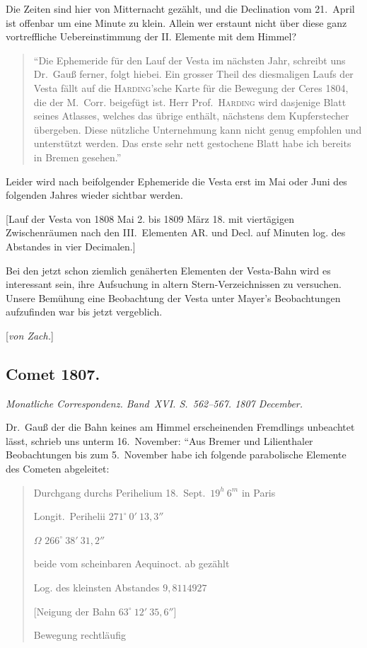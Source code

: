 \documentclass[12pt,a4paper]{book}
\begin{document}
Die Zeiten sind hier von Mitternacht gez\"ahlt, und die Declination vom 21.~April ist offenbar um eine Minute zu klein. Allein wer erstaunt nicht \"uber diese ganz vortreffliche Uebereinstimmung der II. Elemente mit dem Himmel?

\begin{quote}
``Die Ephemeride f\"ur den Lauf der Vesta im n\"achsten Jahr, schreibt uns Dr.~Gau{\ss} ferner, folgt hiebei. Ein grosser Theil des diesmaligen Laufs der Vesta f\"allt auf die \textsc{Harding}'sche Karte f\"ur die Bewegung der Ceres 1804, die der M.~Corr. beigef\"ugt ist. Herr Prof.~\textsc{Harding} wird dasjenige Blatt seines Atlasses, welches das \"ubrige enth\"alt, n\"achstens dem Kupferstecher \"ubergeben. Diese n\"utzliche Unternehmung kann nicht genug empfohlen und unterst\"utzt werden. Das erste sehr nett gestochene Blatt habe ich bereits in Bremen gesehen.''
\end{quote}

Leider wird nach beifolgender Ephemeride die Vesta erst im Mai oder Juni des folgenden Jahres wieder sichtbar werden.

[Lauf der Vesta von 1808 Mai 2. bis 1809 M\"arz 18. mit viert\"agigen Zwischenr\"aumen nach den III.~Elementen AR. und Decl. auf Minuten log. des Abstandes in vier Decimalen.]

Bei den jetzt schon ziemlich gen\"aherten Elementen der Vesta-Bahn wird es interessant sein, ihre Aufsuchung in altern Stern-Verzeichnissen zu versuchen. Unsere Bem\"uhung eine Beobachtung der Vesta unter Mayer's Beobachtungen aufzufinden war bis jetzt vergeblich.

[\textit{von Zach.}]


\newpage
\subsection*{Comet 1807.}

\textit{Monatliche Correspondenz. Band~XVI. S.~562--567. 1807 December.}

Dr.~Gau{\ss} der die Bahn keines am Himmel erscheinenden Fremdlings unbeachtet l\"asst, schrieb uns unterm 16.~November: ``Aus Bremer und Lilienthaler Beobachtungen bis zum 5.~November habe ich folgende parabolische Elemente des Cometen abgeleitet:

\begin{quote}
Durchgang durchs Perihelium 18.~Sept.\ $19^{h}\ 6^{m}$ in Paris

Longit.~Perihelii \dotfill $271^{\circ}\ 0'\ 13{,}3''$

$\Omega$ \dotfill $266^{\circ}\ 38'\ 31{,}2''$

beide vom scheinbaren Aequinoct. ab gez\"ahlt

Log. des kleinsten Abstandes \dotfill $9{,}8114927$

[Neigung der Bahn \dotfill $63^{\circ}\ 12'\ 35{,}6''$]

Bewegung rechtl\"aufig
\end{quote}
\end{document}
